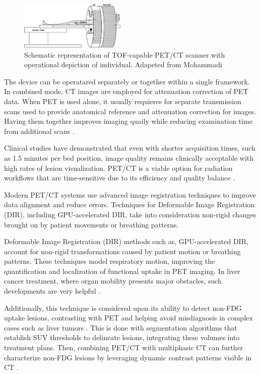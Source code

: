 \begin{multicols}{2}
\begin{figure}[H]
	\centering
	\includegraphics[width=0.45\textwidth]{assets/PETCTtable.jpg} 
	\caption{Schematic representation of TOF-capable PET/CT scanner with operational depiction of individual. Adapeted from Mohammadi \cite{figPETCT}}
	\label{fig:PETCTtable} 
\end{figure}

The device can be operatared separately or together within a single framework. In combined mode, CT images are employed for attenuation correction of PET data. When PET is used alone, it usually requieres for separate transmission scans used to provide anatomical reference and attenuation correction for images. Having them together improves imaging quaily while reducing examination time from additional scans \cite{townsend2004, zaidi2005}.

Clinical studies have demonstrated that even with shorter acquisition times, such as 1.5 minutes per bed position, image quality remains clinically acceptable with high rates of lesion visualization. PET/CT is a viable option for radiation workflows that are time-sensitive due to its efficiency and quality balance \cite{hasegawa2012}.


Modern PET/CT systems use advanced image registration techniques to improve data alignment and reduce errors.
Techniques for Deformable Image Registration (DIR), including GPU-accelerated DIR, take into consideration non-rigid changes brought on by patient movements or breathing patterns. 

Deformable Image Registration (DIR) methods such as, GPU-accelerated DIR, account for non-rigid transformations caused by patient motion or breathing patterns. These techniques model respiratory motion, improving the quantification and localization of functional uptake in PET imaging. In liver cancer treatment, where organ mobility presents major obstacles, such developments are very helpful \cite{shi2023}.

Additionally, this technique is considered upon its ability to detect non-FDG uptake lesions, contrasting with PET and helping avoid misdiagnosis in complex cases such as liver tumors \cite{yan2024, decazes2021}. This is done with segmentation algorithms that establish SUV thresholds to delineate lesions, integrating these volumes into treatment plans. Then, combining PET/CT with multiphasic CT can further characterize non-FDG lesions by leveraging dynamic contrast patterns visible in CT \cite{TG174}.


\end{multicols}
